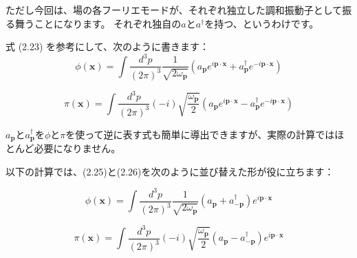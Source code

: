 \documentclass[a4paper,12pt]{article}
\begin{document}
ただし今回は、場の各フーリエモードが、それぞれ独立した調和振動子として振る舞うことになります。
それぞれ独自の$a$と$a^\dagger$を持つ、というわけです。

式 (2.23) を参考にして、次のように書きます：
\begin{equation}
\phi(\mathbf{x}) = \int \frac{d^3p}{(2\pi)^3} \frac{1}{\sqrt{2\omega_{\mathbf{p}}}} \left( a_{\mathbf{p}} e^{i\mathbf{p}\cdot\mathbf{x}} + a^\dagger_{\mathbf{p}} e^{-i\mathbf{p}\cdot\mathbf{x}} \right)
\tag{2.25}
\end{equation}

\begin{equation}
\pi(\mathbf{x}) = \int \frac{d^3p}{(2\pi)^3} \left( -i \right) \sqrt{\frac{\omega_{\mathbf{p}}}{2}} \left( a_{\mathbf{p}} e^{i\mathbf{p}\cdot\mathbf{x}} - a^\dagger_{\mathbf{p}} e^{-i\mathbf{p}\cdot\mathbf{x}} \right)
\tag{2.26}
\end{equation}

$a_{\mathbf{p}}$と$a^\dagger_{\mathbf{p}}$を$\phi$と$\pi$を使って逆に表す式も簡単に導出できますが、実際の計算ではほとんど必要になりません。

以下の計算では、(2.25)と(2.26)を次のように並び替えた形が役に立ちます：

\begin{equation}
\phi(\mathbf{x}) = \int \frac{d^3p}{(2\pi)^3} \frac{1}{\sqrt{2\omega_{\mathbf{p}}}} (a_{\mathbf{p}} + a^\dagger_{-\mathbf{p}}) e^{i\mathbf{p}\cdot\mathbf{x}}
\tag{2.27}
\end{equation}

\begin{equation}
\pi(\mathbf{x}) = \int \frac{d^3p}{(2\pi)^3} \left( -i \right) \sqrt{\frac{\omega_{\mathbf{p}}}{2}} (a_{\mathbf{p}} - a^\dagger_{-\mathbf{p}}) e^{i\mathbf{p}\cdot\mathbf{x}}
\tag{2.28}
\end{equation}


 
\end{document}
